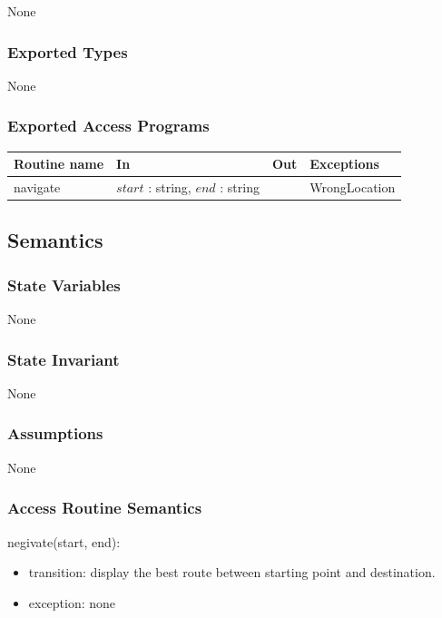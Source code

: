 \documentclass[12pt]{article}
\begin{document}
None

\subsubsection* {Exported Types}

None

\subsubsection* {Exported Access Programs}

\begin{tabular}{| l | l | l | p{5cm} |}
\hline
\textbf{Routine name} & \textbf{In} & \textbf{Out} & \textbf{Exceptions}\\
\hline
navigate & $start$ : string, $end$ : string & ~ & WrongLocation\\
\hline
\end{tabular}

\subsection* {Semantics}

\subsubsection* {State Variables}

None

\subsubsection* {State Invariant}

None

\subsubsection* {Assumptions}

None

\subsubsection* {Access Routine Semantics}



\noindent negivate(start, end):
\begin{itemize}
\item transition: display the best route between starting point and destination.
\item exception: none
\end{itemize}
\end{document}
